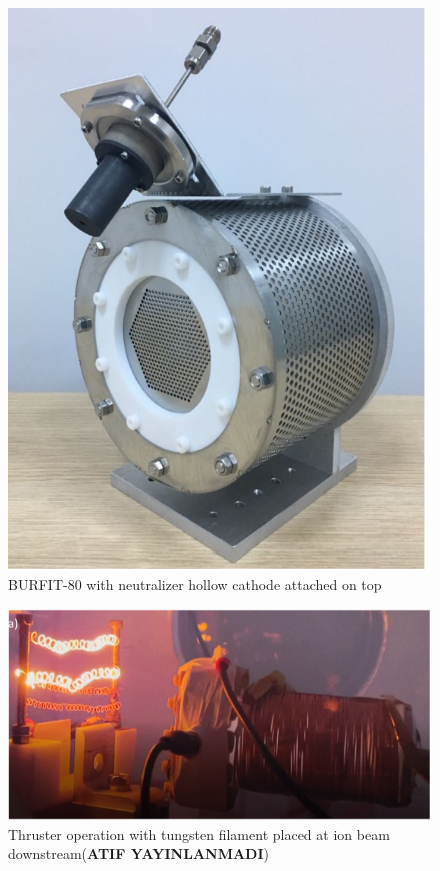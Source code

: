 \begin{figure}[ht]
    \centering
    \includegraphics[scale=0.5]{fig/burfitneut.png}
    \caption[BURFIT-80 with neutralizer hollow cathode attached on top]{BURFIT-80 with neutralizer hollow cathode attached on top\cite{kokal2019development}}
    \label{fig:burfitneut}  
\end{figure}

\begin{figure}[ht]
    \centering
    \includegraphics[scale=0.75]{fig/tungstenneut.png}
    \caption{Thruster operation with tungsten filament placed at ion beam downstream(\textbf{ATIF YAYINLANMADI})}
    \label{fig:tungstenneut}  
\end{figure}

